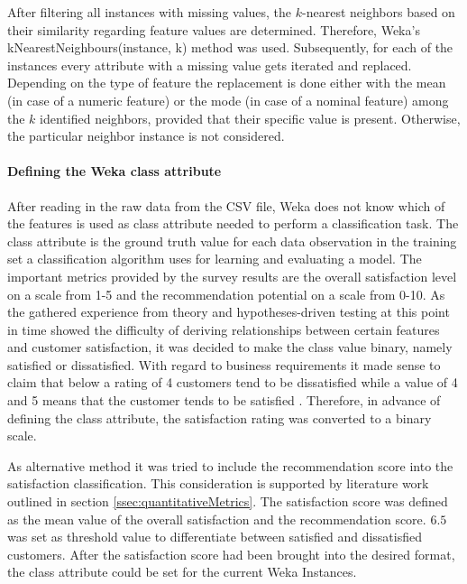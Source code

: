 After filtering all instances with missing values, the $k$-nearest neighbors based on their similarity regarding feature values are determined. Therefore, Weka's kNearestNeighbours(instance, k) method was used. Subsequently, for each of the instances every attribute with a missing value gets iterated and replaced. Depending on the type of feature the replacement is done either with the mean (in case of a numeric feature) or the mode (in case of a nominal feature) among the $k$ identified neighbors, provided that their specific value is present. Otherwise, the particular neighbor instance is not considered.

\paragraph{Defining the Weka class attribute}
After reading in the raw data from the CSV file, Weka does not know which of the features is used as class attribute needed to perform a classification task. The class attribute is the ground truth value for each data observation in the training set a classification algorithm uses for learning and evaluating a model. The important metrics provided by the survey results are the overall satisfaction level on a scale from 1-5 and the recommendation potential on a scale from 0-10. As the gathered experience from theory and hypotheses-driven testing at this point in time showed the difficulty of deriving relationships between certain features and customer satisfaction, it was decided to make the class value binary, namely satisfied or dissatisfied. With regard to business requirements it made sense to claim that below a rating of 4 customers tend to be dissatisfied while a value of 4 and 5 means that the customer tends to be satisfied \cite{meinzer2016can}. Therefore, in advance of defining the class attribute, the satisfaction rating was converted to a binary scale. 

As alternative method it was tried to include the recommendation score into the satisfaction classification. This consideration is supported by literature work outlined in section \ref{ssec:quantitativeMetrics}. The satisfaction score was defined as the mean value of the overall satisfaction and the recommendation score. $6.5$ was set as threshold value to differentiate between satisfied and dissatisfied customers. After the satisfaction score had been brought into the desired format, the class attribute could be set for the current Weka Instances.

